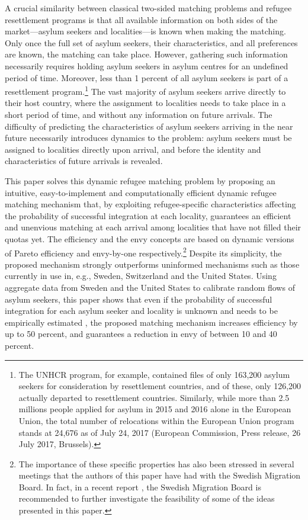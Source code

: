 \documentclass[12pt,fleqn]{article}
\begin{document}
A crucial similarity between classical two-sided matching problems and refugee resettlement programs is that all available information on both sides of the market---asylum seekers and localities---is known when making the matching. Only once the full set of asylum seekers, their characteristics, and all preferences are known, the matching can take place. However, gathering such information necessarily requires holding asylum seekers in asylum centres for an undefined period of time. Moreover, less than 1 percent of all asylum seekers is part of a resettlement program.\footnote{The UNHCR program, for example, contained files of only 163,200 asylum seekers for consideration by resettlement countries, and of these, only 126,200 actually departed to resettlement countries. Similarly, while more than 2.5 millions people applied for asylum in 2015 and 2016 alone in the European Union, the total number of relocations within the European Union program stands at 24,676 as of July 24, 2017 (European Commission, Press release, 26 July 2017, Brussels).} The vast majority of asylum seekers arrive directly to their host country, where the assignment to localities needs to take place in a short period of time, and without any information on future arrivals. The difficulty of predicting the characteristics of asylum seekers arriving in the near future necessarily introduces dynamics to the problem: asylum seekers must be assigned to localities directly upon arrival, and before the identity and characteristics of future arrivals is revealed. 

This paper solves this dynamic refugee matching problem by proposing an intuitive, easy-to-implement and computationally efficient dynamic refugee matching mechanism that, by exploiting refugee-specific characteristics affecting the probability of successful integration at each locality, guarantees an efficient and unenvious matching at each arrival among localities that have not filled their quotas yet. The efficiency and the envy concepts are based on dynamic versions of Pareto efficiency and envy-by-one \citep{bib:Budish} respectively.\footnote{The importance of these specific properties has also been stressed in several meetings that the authors of this paper have had with the Swedish Migration Board. In fact, in a recent report \citep[Swedish Government,][]{SOU2018}, the Swedish Migration Board is recommended to further investigate the feasibility of some of the ideas presented in this paper.} Despite its simplicity, the proposed mechanism strongly outperforms uninformed mechanisms such as those currently in use in, e.g., Sweden, Switzerland and the United States. Using aggregate data from Sweden and the United States to calibrate random flows of asylum seekers, this paper shows that even if the probability of successful integration for each asylum seeker and locality is unknown and needs to be empirically estimated \citep[as in][]{bib:BansakEtAl}, the proposed matching mechanism increases efficiency by up to 50 percent, and guarantees a reduction in envy of between 10 and 40 percent.
\end{document}
